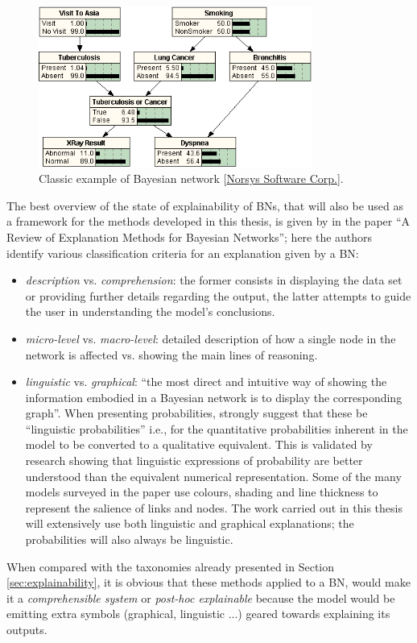 \begin{figure}[htbp]
\centerline{\includegraphics[width=0.8\textwidth]{literature-review/images/asia-bn}}
\caption{Classic example of Bayesian network [\href{https://www.norsys.com/WebHelp/NETICA/X_Example_Bayes_Net.htm}{Norsys Software Corp.}].}
\label{fig:asia-bn}
\end{figure}

The best overview of the state of explainability of BNs, that will also be used as a framework for the methods developed in this thesis, is given by \citet{lacave2002review} in the paper \enquote{A Review of Explanation Methods for Bayesian Networks}; here the authors identify various classification criteria for an explanation given by a BN:
\begin{itemize}
  \item \textit{description} vs. \textit{comprehension}: the former consists in displaying the data set or providing further details regarding the output, the latter attempts to guide the user in understanding the model's conclusions.
  \item \textit{micro-level} vs. \textit{macro-level}: detailed description of how a single node in the network is affected vs. showing the main lines of reasoning.
  \item \textit{linguistic} vs. \textit{graphical}: \enquote{the most direct and intuitive way of showing the information embodied in a Bayesian network is to display the corresponding graph}.
  When presenting probabilities, \citet{henrion1990qualtitative} strongly suggest that these be \enquote{linguistic probabilities} i.e., for the quantitative probabilities inherent in the model to be converted to a qualitative equivalent.
  This is validated by research showing that linguistic expressions of probability are better understood than the equivalent numerical representation. 
  Some of the many models surveyed in the paper use colours, shading and line thickness to represent the salience of links and nodes.
  The work carried out in this thesis will extensively use both linguistic and graphical explanations; the probabilities will also always be linguistic.
\end{itemize}
When compared with the taxonomies already presented in Section \ref{sec:explainability}, it is obvious that these methods applied to a BN, would make it a \textit{comprehensible system} or \textit{post-hoc explainable} because the model would be emitting extra symbols (graphical, linguistic ...) geared towards explaining its outputs.

